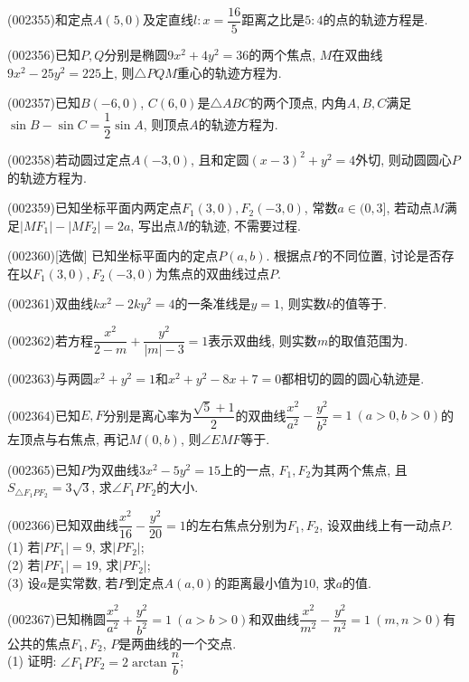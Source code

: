 \item (002355)和定点$A(5,0)$及定直线$l: x=\dfrac{16}{5}$距离之比是$5:4$的点的轨迹方程是.
\item (002356)已知$P,Q$分别是椭圆$9x^2+4y^2=36$的两个焦点, $M$在双曲线$9x^2-25y^2=225$上, 则$\triangle PQM$重心的轨迹方程为.
\item (002357)已知$B(-6,0)$, $C(6,0)$是$\triangle ABC$的两个顶点, 内角$A,B,C$满足$\sin B-\sin C=\dfrac{1}{2}\sin A$, 则顶点$A$的轨迹方程为.
\item (002358)若动圆过定点$A(-3,0)$, 且和定圆$(x-3)^2+y^2=4$外切, 则动圆圆心$P$的轨迹方程为.
\item (002359)已知坐标平面内两定点${{F}_{1}}(3,0),{{F}_{2}}(-3,0)$, 常数$a\in (0,3]$, 若动点$M$满足$|M{{F}_{1}}|-|M{{F}_{2}}|=2a$, 写出点$M$的轨迹, 不需要过程.
\item (002360)[选做]
已知坐标平面内的定点$P(a,b)$. 根据点$P$的不同位置, 讨论是否存在以${{F}_{1}}(3,0),{{F}_{2}}(-3,0)$为焦点的双曲线过点$P$.
\item (002361)双曲线$kx^2-2ky^2=4$的一条准线是$y=1$, 则实数$k$的值等于.
\item (002362)若方程$\dfrac{x^2}{2-m}+\dfrac{y^2}{|m|-3}=1$表示双曲线, 则实数$m$的取值范围为.
\item (002363)与两圆$x^2+y^2=1$和$x^2+y^2-8x+7=0$都相切的圆的圆心轨迹是.
\item (002364)已知$E,F$分别是离心率为$\dfrac{\sqrt{5}+1}{2}$的双曲线$\dfrac{x^2}{a^2}-\dfrac{y^2}{b^2}=1 \ (a>0,b>0)$的左顶点与右焦点, 再记$M(0,b)$, 则$\angle EMF$等于.
\item (002365)已知$P$为双曲线$3x^2-5y^2=15$上的一点, $F_1,F_2$为其两个焦点, 且$S_{\triangle F_1PF_2}=3\sqrt{3}$, 求$\angle F_1PF_2$的大小.
\item (002366)已知双曲线$\dfrac{{{x}^{2}}}{16}-\dfrac{{{y}^{2}}}{20}=1$的左右焦点分别为${{F}_{1}},{{F}_{2}}$, 设双曲线上有一动点$P$.\\ 
(1) 若$|P{{F}_{1}}|=9$, 求$|P{{F}_{2}}|$;\\ 
(2) 若$|P{{F}_{1}}|=19$, 求$|P{{F}_{2}}|$;\\ 
(3) 设$a$是实常数, 若$P$到定点$A(a,0)$的距离最小值为$10$, 求$a$的值.
\item (002367)已知椭圆$\dfrac{x^2}{a^2}+\dfrac{y^2}{b^2}=1\ (a>b>0)$和双曲线$\dfrac{x^2}{m^2}-\dfrac{y^2}{n^2}=1 \ (m,n>0)$有公共的焦点$F_1,F_2$, $P$是两曲线的一个交点.\\ 
(1) 证明: $\angle F_1PF_2=2\arctan \dfrac{n}{b}$;\\ 

